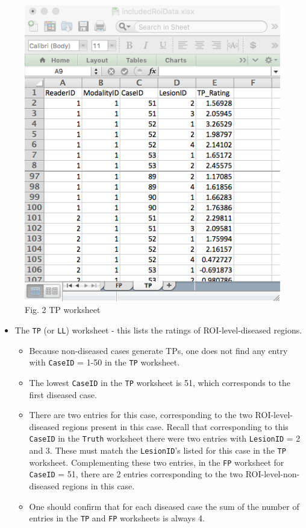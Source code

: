 \documentclass[
]{book}
\providecommand{\tightlist}{%
  \setlength{\itemsep}{0pt}\setlength{\parskip}{0pt}}
\begin{document}
\begin{figure}

{\centering \includegraphics[width=0.5\linewidth,height=0.2\textheight]{images/ROI-TP-1} 

}

\caption{Fig. 2 TP worksheet}\label{fig:unnamed-chunk-5}
\end{figure}

\begin{itemize}
\tightlist
\item
  The \texttt{TP} (or \texttt{LL}) worksheet - this lists the ratings of ROI-level-diseased regions.

  \begin{itemize}
  \tightlist
  \item
    Because non-diseased cases generate TPs, one does not find any entry with \texttt{CaseID} = 1-50 in the \texttt{TP} worksheet.\\
  \item
    The lowest \texttt{CaseID} in the \texttt{TP} worksheet is 51, which corresponds to the first diseased case.\\
  \item
    There are two entries for this case, corresponding to the two ROI-level-diseased regions present in this case. Recall that corresponding to this \texttt{CaseID} in the \texttt{Truth} worksheet there were two entries with \texttt{LesionID} = 2 and 3. These must match the \texttt{LesionID}'s listed for this case in the \texttt{TP} worksheet. Complementing these two entries, in the \texttt{FP} worksheet for \texttt{CaseID} = 51, there are 2 entries corresponding to the two ROI-level-non-diseased regions in this case.\\
  \item
    One should confirm that for each diseased case the sum of the number of entries in the \texttt{TP} and \texttt{FP} worksheets is always 4.
  \end{itemize}
\end{itemize}
\end{document}
